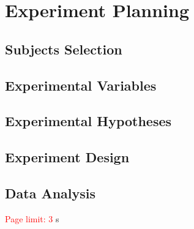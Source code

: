 \section{Experiment Planning}

\subsection{Subjects Selection}
\subsection{Experimental Variables}
\subsection{Experimental Hypotheses}
\subsection{Experiment Design}
\subsection{Data Analysis}

\textcolor{red}{Page limit: 3}
 s